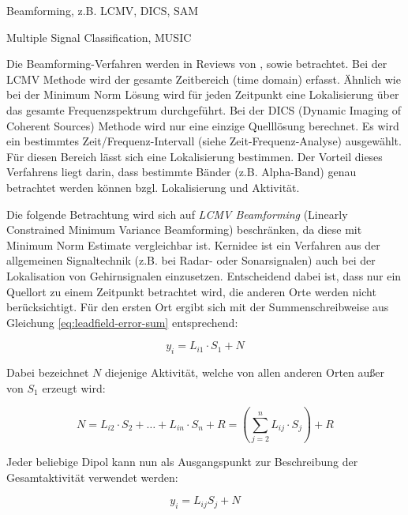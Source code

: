 \documentclass[doc,a4paper,12pt]{apa6}
\begin{document}
\begin{compactitem}
\item Beamforming, z.B. LCMV, DICS, SAM
\item Multiple Signal Classification, MUSIC
\end{compactitem}

Die Beamforming-Verfahren werden in Reviews von \textcite{hillebrand2005beamformer}, sowie \textcite{hillebrand2005new} betrachtet. Bei der LCMV Methode \parencite{van1997localization} wird der gesamte Zeitbereich (time domain) erfasst. Ähnlich wie bei der Minimum Norm Lösung wird für jeden Zeitpunkt eine Lokalisierung über das gesamte Frequenzspektrum durchgeführt. Bei der DICS (Dynamic Imaging of Coherent Sources) Methode wird nur eine einzige Quelllösung berechnet. Es wird ein bestimmtes Zeit/Frequenz-Intervall (siehe Zeit-Frequenz-Analyse) ausgewählt. Für diesen Bereich lässt sich eine Lokalisierung bestimmen. Der Vorteil dieses Verfahrens liegt darin, dass bestimmte Bänder (z.B. Alpha-Band) genau betrachtet werden können bzgl. Lokalisierung und Aktivität.

Die folgende Betrachtung wird sich auf \emph{LCMV Beamforming} (Linearly Constrained Minimum Variance Beamforming) beschränken, da diese mit Minimum Norm Estimate vergleichbar ist. Kernidee ist ein Verfahren aus der allgemeinen Signaltechnik (z.B. bei Radar- oder Sonarsignalen) auch bei der Lokalisation von Gehirnsignalen einzusetzen. Entscheidend dabei ist, dass nur ein Quellort zu einem Zeitpunkt betrachtet wird, die anderen Orte werden nicht berücksichtigt. Für den ersten Ort ergibt sich mit der Summenschreibweise aus Gleichung \ref{eq:leadfield-error-sum} entsprechend:

\begin{equation}
y_i = L_{i1} \cdot S_1 + N
\end{equation}

Dabei bezeichnet $N$ diejenige Aktivität, welche von allen anderen Orten außer von $S_1$ erzeugt wird:

\begin{equation}
N = L_{i2} \cdot S_2 + \ldots + L_{in} \cdot S_n + R = \left( \sum_{j=2}^n L_{ij} \cdot S_j \right) + R
\end{equation}

Jeder beliebige Dipol kann nun als Ausgangspunkt zur Beschreibung der Gesamtaktivität verwendet werden:

\begin{equation}
\label{eq:beam}
y_i = L_{ij} S_j + N
\end{equation}
\end{document}
